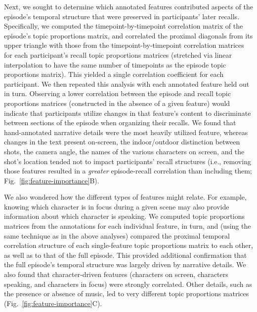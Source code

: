 \documentclass{article}
\begin{document}
Next, we sought to determine which annotated features contributed aspects of the episode's temporal structure that were preserved in participants' later recalls.  Specifically, we computed the timepoint-by-timepoint correlation matrix of the episode's topic proportions matrix, and correlated the proximal diagonals from its upper triangle with those from the timepoint-by-timepoint correlation matrices for each participant's recall topic proportions matrices (stretched via linear interpolation to have the same number of timepoints as the episode topic proportions matrix).  This yielded a single correlation coefficient for each participant.  We then repeated this analysis with each annotated feature held out in turn.  Observing a lower correlation between the episode and recall topic proportions matrices (constructed in the absence of a given feature) would indicate that participants utilize changes in that feature's content to discriminate between sections of the episode when organizing their recalls.  We found that hand-annotated narrative details were the most heavily utilized feature, whereas changes in the text present on-screen, the indoor/outdoor distinction between shots, the camera angle, the names of the various characters on screen, and the shot's location tended not to impact participants' recall structures (i.e., removing those features resulted in a \textit{greater} episode-recall correlation than including them; Fig.~\ref{fig:feature-importance}B).

We also wondered how the different types of features might relate.  For example, knowing which character is in focus during a given scene may also provide information about which character is speaking.  We computed topic proportions matrices from the annotations for each individual feature, in turn, and (using the same technique as in the above analyses) compared the proximal temporal correlation structure of each single-feature topic proportions matrix to each other, as well as to that of the full episode.  This provided additional confirmation that the full episode's temporal structure was largely driven by narrative details.  We also found that character-driven features (characters on screen, characters speaking, and characters in focus) were strongly correlated.  Other details, such as the presence or absence of music, led to very different topic proportions matrices (Fig.~\ref{fig:feature-importance}C).
\end{document}
